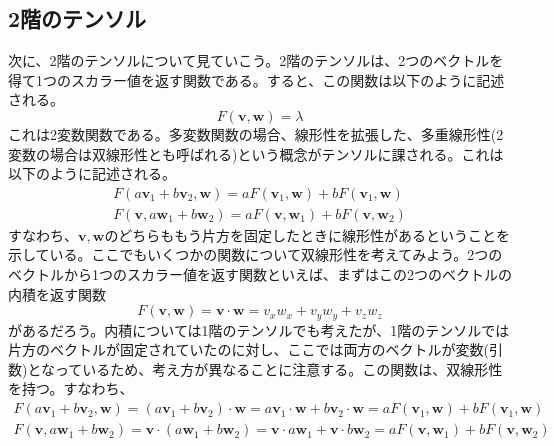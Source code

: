 \subsection{2階のテンソル}
次に、2階のテンソルについて見ていこう。2階のテンソルは、2つのベクトルを得て1つのスカラー値を返す関数である。すると、この関数は以下のように記述される。
\begin{equation}
	F(\boldsymbol{v},\boldsymbol{w})=\lambda
\end{equation}
これは2変数関数である。多変数関数の場合、線形性を拡張した、多重線形性(2変数の場合は双線形性とも呼ばれる)という概念がテンソルに課される。これは以下のように記述される。
\begin{equation}
	\begin{aligned}
		F(a\boldsymbol{v}_1+b\boldsymbol{v}_2,\boldsymbol{w})=aF(\boldsymbol{v}_1,\boldsymbol{w})+bF(\boldsymbol{v}_1,\boldsymbol{w}) \\
		F(\boldsymbol{v},a\boldsymbol{w}_1+b\boldsymbol{w}_2)=aF(\boldsymbol{v},\boldsymbol{w}_1)+bF(\boldsymbol{v},\boldsymbol{w}_2)
	\end{aligned}
\end{equation}
すなわち、\(\boldsymbol{v},\boldsymbol{w}\)のどちらももう片方を固定したときに線形性があるということを示している。ここでもいくつかの関数について双線形性を考えてみよう。2つのベクトルから1つのスカラー値を返す関数といえば、まずはこの2つのベクトルの内積を返す関数
\begin{equation}
	F(\boldsymbol{v},\boldsymbol{w})=\boldsymbol{v}\cdot\boldsymbol{w}= v_x w_x +v_y w_y+ v_z w_z
\end{equation}
があるだろう。内積については1階のテンソルでも考えたが、1階のテンソルでは片方のベクトルが固定されていたのに対し、ここでは両方のベクトルが変数(引数)となっているため、考え方が異なることに注意する。この関数は、双線形性を持つ。すなわち、
\begin{equation}
	\begin{aligned}
		F(a\boldsymbol{v}_1+b\boldsymbol{v}_2,\boldsymbol{w})
		=(a\boldsymbol{v}_1+b\boldsymbol{v}_2)\cdot\boldsymbol{w}
		=a\boldsymbol{v}_1\cdot \boldsymbol{w} + b\boldsymbol{v}_2\cdot \boldsymbol{w} =aF(\boldsymbol{v}_1,\boldsymbol{w})+bF(\boldsymbol{v}_1,\boldsymbol{w}) \\
		F(\boldsymbol{v},a\boldsymbol{w}_1+b\boldsymbol{w}_2)
		=\boldsymbol{v}\cdot(a\boldsymbol{w}_1+b\boldsymbol{w}_2)
		=\boldsymbol{v}\cdot a\boldsymbol{w}_1 + \boldsymbol{v}\cdot b\boldsymbol{w}_2 =aF(\boldsymbol{v},\boldsymbol{w}_1)+bF(\boldsymbol{v},\boldsymbol{w}_2)
	\end{aligned}
\end{equation}
